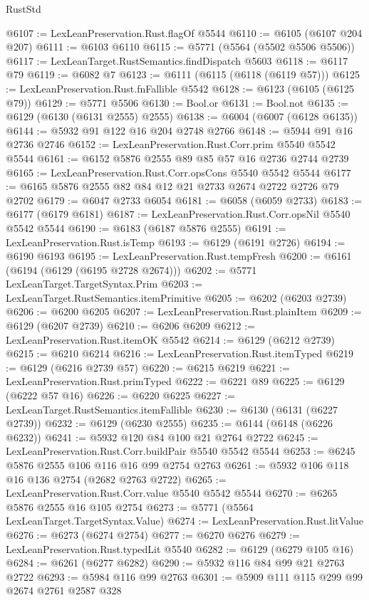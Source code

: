 \begin{lexlean}{RustStd}
\begin{coremodule}
@6107 := LexLeanPreservation.Rust.flagOf @5544
@6110 := @6105 (@6107 @204 @207)
@6111 := @6103 @6110
@6115 := @5771 (@5564 (@5502 @5506 @5506))
@6117 := LexLeanTarget.RustSemantics.findDispatch @5603
@6118 := @6117 @79
@6119 := @6082 @7
@6123 := @6111 (@6115 (@6118 (@6119 @57)))
@6125 := LexLeanPreservation.Rust.fnFallible @5542
@6128 := @6123 (@6105 (@6125 @79))
@6129 := @5771 @5506
@6130 := Bool.or
@6131 := Bool.not
@6135 := @6129 (@6130 (@6131 @2555) @2555)
@6138 := @6004 (@6007 (@6128 @6135))
@6144 := @5932 @91 @122 @16 @204 @2748 @2766
@6148 := @5944 @91 @16 @2736 @2746
@6152 := LexLeanPreservation.Rust.Corr.prim @5540 @5542 @5544
@6161 := @6152 @5876 @2555 @89 @85 @57 @16 @2736 @2744 @2739
@6165 := LexLeanPreservation.Rust.Corr.opsCons @5540 @5542 @5544
@6177 := @6165 @5876 @2555 @82 @84 @12 @21 @2733 @2674 @2722 @2726 @79 @2702
@6179 := @6047 @2733 @6054
@6181 := @6058 (@6059 @2733)
@6183 := @6177 (@6179 @6181)
@6187 := LexLeanPreservation.Rust.Corr.opsNil @5540 @5542 @5544
@6190 := @6183 (@6187 @5876 @2555)
@6191 := LexLeanPreservation.Rust.isTemp
@6193 := @6129 (@6191 @2726)
@6194 := @6190 @6193
@6195 := LexLeanPreservation.Rust.tempFresh
@6200 := @6161 (@6194 (@6129 (@6195 @2728 @2674)))
@6202 := @5771 LexLeanTarget.TargetSyntax.Prim
@6203 := LexLeanTarget.RustSemantics.itemPrimitive
@6205 := @6202 (@6203 @2739)
@6206 := @6200 @6205
@6207 := LexLeanPreservation.Rust.plainItem
@6209 := @6129 (@6207 @2739)
@6210 := @6206 @6209
@6212 := LexLeanPreservation.Rust.itemOK @5542
@6214 := @6129 (@6212 @2739)
@6215 := @6210 @6214
@6216 := LexLeanPreservation.Rust.itemTyped
@6219 := @6129 (@6216 @2739 @57)
@6220 := @6215 @6219
@6221 := LexLeanPreservation.Rust.primTyped
@6222 := @6221 @89
@6225 := @6129 (@6222 @57 @16)
@6226 := @6220 @6225
@6227 := LexLeanTarget.RustSemantics.itemFallible
@6230 := @6130 (@6131 (@6227 @2739))
@6232 := @6129 (@6230 @2555)
@6235 := @6144 (@6148 (@6226 @6232))
@6241 := @5932 @120 @84 @100 @21 @2764 @2722
@6245 := LexLeanPreservation.Rust.Corr.buildPair @5540 @5542 @5544
@6253 := @6245 @5876 @2555 @106 @116 @16 @99 @2754 @2763
@6261 := @5932 @106 @118 @16 @136 @2754 (@2682 @2763 @2722)
@6265 := LexLeanPreservation.Rust.Corr.value @5540 @5542 @5544
@6270 := @6265 @5876 @2555 @16 @105 @2754
@6273 := @5771 (@5564 LexLeanTarget.TargetSyntax.Value)
@6274 := LexLeanPreservation.Rust.litValue
@6276 := @6273 (@6274 @2754)
@6277 := @6270 @6276
@6279 := LexLeanPreservation.Rust.typedLit @5540
@6282 := @6129 (@6279 @105 @16)
@6284 := @6261 (@6277 @6282)
@6290 := @5932 @116 @84 @99 @21 @2763 @2722
@6293 := @5984 @116 @99 @2763
@6301 := @5909 @111 @115 @299 @99 @2674 @2761 @2587 @328

\end{coremodule}
\end{lexlean}
